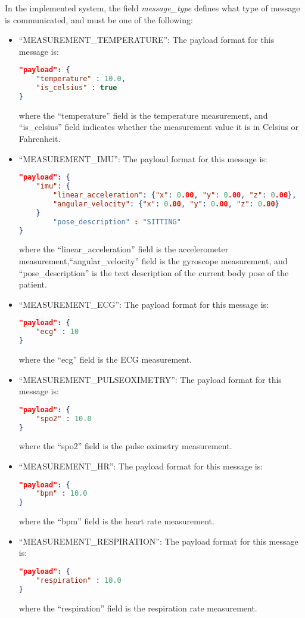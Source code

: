 In the implemented system, the field \textit{message\_type} defines what type of message is communicated, and must be one of the following:

\begin{itemize}
    \item ``MEASUREMENT\_TEMPERATURE'': The payload format for this message is:
        \begin{lstlisting}[language=json]            
"payload": {
    "temperature" : 10.0,
    "is_celsius" : true 
} 
        \end{lstlisting} 
        where the ``temperature'' field is the temperature measurement, and ``is\_celsius'' field indicates whether the measurement value it is in Celsius or Fahrenheit.
    
        \item ``MEASUREMENT\_IMU'': The payload format for this message is:
        \begin{lstlisting}[language=json]            
"payload": {
    "imu": {
        "linear_acceleration": {"x": 0.00, "y": 0.00, "z": 0.00},
        "angular_velocity": {"x": 0.00, "y": 0.00, "z": 0.00} 
    }
        "pose_description" : "SITTING"
} 
        \end{lstlisting} 
        where the ``linear\_acceleration'' field is the accelerometer measurement,``angular\_velocity'' field is the gyroscope measurement, and ``pose\_description'' is the text description of the current body pose of the patient.

    \item ``MEASUREMENT\_ECG'': The payload format for this message is:
        \begin{lstlisting}[language=json]            
"payload": {
    "ecg" : 10
} 
        \end{lstlisting} 
        where the ``ecg'' field is the \acs{ECG} measurement.
    \item ``MEASUREMENT\_PULSEOXIMETRY'': The payload format for this message is:
        \begin{lstlisting}[language=json]            
"payload": {
    "spo2" : 10.0
} 
        \end{lstlisting} 
        where the ``spo2'' field is the pulse oximetry measurement.


    \item ``MEASUREMENT\_HR'': The payload format for this message is:
        \begin{lstlisting}[language=json]            
"payload": {
    "bpm" : 10.0
} 
        \end{lstlisting} 
        where the ``bpm'' field is the heart rate measurement.


    \item ``MEASUREMENT\_RESPIRATION'': The payload format for this message is:
        \begin{lstlisting}[language=json]            
"payload": {
    "respiration" : 10.0
} 
        \end{lstlisting} 
        where the ``respiration'' field is the respiration rate measurement.
\end{itemize}